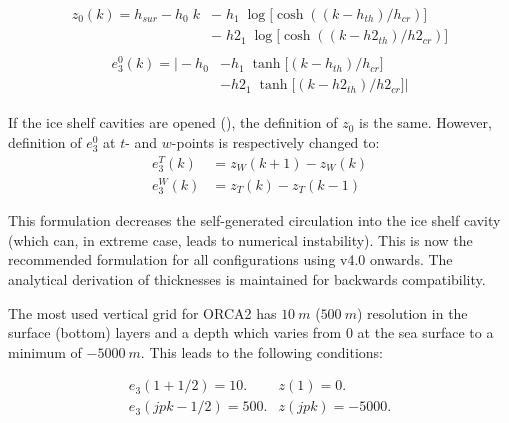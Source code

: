 \documentclass[../main/NEMO_manual]{subfiles}
\begin{document}
\begin{gather}
  \label{eq:DOMCFG_zgr_ana_1b}
    \begin{split}
    z_0  (k) = h_{sur} - h_0 \; k &- \; h_1 \; \log  \big[ \cosh ((k - h_{th}) / h_{cr}) \big] \\
                             \;   &- \; h2_1 \; \log  \big[ \cosh ((k - h2_{th}) / h2_{cr}) \big]
    \end{split}
\end{gather}
\begin{gather}
    \begin{split}
    e_3^0(k) = \big|    - h_0    &-   h_1 \; \tanh \big[       (k - h_{th})  / h_{cr}   \big]  \\
                                 &-  h2_1 \; \tanh \big[       (k - h2_{th}) / h2_{cr}  \big] \big|
    \end{split}
\end{gather}

If the ice shelf cavities are opened (), the definition
of $z_0$ is the same.  However, definition of $e_3^0$ at $t$- and $w$-points is
respectively changed to:
\begin{equation}
  \label{eq:DOMCFG_zgr_ana_2}
  \begin{split}
    e_3^T(k) &= z_W (k + 1) - z_W (k    ) \\
    e_3^W(k) &= z_T (k    ) - z_T (k - 1)
  \end{split}
\end{equation}

This formulation decreases the self-generated circulation into the ice shelf cavity
(which can, in extreme case, leads to numerical instability). This is now the recommended formulation for all configurations using v4.0 onwards. The analytical derivation of thicknesses is maintained for backwards compatibility.

The most used vertical grid for ORCA2 has $10~m$ ($500~m$) resolution in the surface
(bottom) layers and a depth which varies from 0 at the sea surface to a minimum of
$-5000~m$.  This leads to the following conditions:

\begin{equation}
  \label{eq:DOMCFG_zgr_coef}
  \begin{array}{ll}
    e_3 (1   + 1/2) =  10. & z(1  ) =     0. \\
    e_3 (jpk - 1/2) = 500. & z(jpk) = -5000.
  \end{array}
\end{equation}
\end{document}

